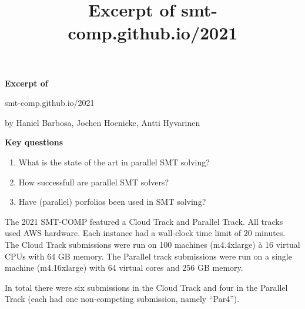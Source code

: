\documentclass{scrartcl}
\title{Excerpt of smt-comp.github.io/2021}
\begin{document}
\begin{center}
    \Large{\textbf{Excerpt of}}

    \LARGE{smt-comp.github.io/2021}

    \large{by Haniel Barbosa, Jochen Hoenicke, Antti Hyvarinen}
\end{center}

\vspace{1cm}

\begin{addmargin}[0.2\linewidth]{0.2\linewidth}
    \begin{center}
        \textbf{Key questions}
    \end{center}
    \begin{enumerate}[i]
        \item What is the state of the art in parallel SMT solving?
        \item How successfull are parallel SMT solvers?
        \item Have (parallel) porfolios been used in SMT solving?
    \end{enumerate}
\end{addmargin}

\vspace{1cm}

The 2021 SMT-COMP featured a Cloud Track and Parallel Track.
All tracks used AWS hardware.
Each instance had a wall-clock time limit of 20 minutes.
The Cloud Track submissions were run on 100 machines (m4.4xlarge)
à 16 virtual CPUs with 64 GB memory.
The Parallel track submissions were run on a single machine (m4.16xlarge)
with 64 virtual cores and 256 GB memory.

In total there were six submissions in the Cloud Track and four in the Parallel Track
(each had one non-competing submission, namely \enquote{Par4}).
\end{document}
